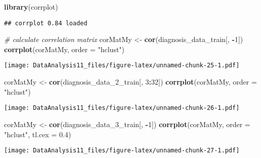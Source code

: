 \documentclass[]{article}
\newenvironment{Shaded}{\begin{snugshade}}{\end{snugshade}}
\newcommand{\KeywordTok}[1]{\textcolor[rgb]{0.13,0.29,0.53}{\textbf{#1}}}
\newcommand{\DataTypeTok}[1]{\textcolor[rgb]{0.13,0.29,0.53}{#1}}
\newcommand{\DecValTok}[1]{\textcolor[rgb]{0.00,0.00,0.81}{#1}}
\newcommand{\FloatTok}[1]{\textcolor[rgb]{0.00,0.00,0.81}{#1}}
\newcommand{\StringTok}[1]{\textcolor[rgb]{0.31,0.60,0.02}{#1}}
\newcommand{\CommentTok}[1]{\textcolor[rgb]{0.56,0.35,0.01}{\textit{#1}}}
\newcommand{\OperatorTok}[1]{\textcolor[rgb]{0.81,0.36,0.00}{\textbf{#1}}}
\newcommand{\NormalTok}[1]{#1}
\begin{document}
\begin{Shaded}
\begin{Highlighting}[]
\KeywordTok{library}\NormalTok{(corrplot)}
\end{Highlighting}
\end{Shaded}

\begin{verbatim}
## corrplot 0.84 loaded
\end{verbatim}

\begin{Shaded}
\begin{Highlighting}[]
\CommentTok{# calculate correlation matrix}
\NormalTok{corMatMy <-}\StringTok{ }\KeywordTok{cor}\NormalTok{(diagnosis_data_train[, }\OperatorTok{-}\DecValTok{1}\NormalTok{])}
\KeywordTok{corrplot}\NormalTok{(corMatMy, }\DataTypeTok{order =} \StringTok{"hclust"}\NormalTok{)}
\end{Highlighting}
\end{Shaded}

\texttt{[image: DataAnalysis11\_files/figure-latex/unnamed-chunk-25-1.pdf]}

\begin{Shaded}
\begin{Highlighting}[]
\NormalTok{corMatMy <-}\StringTok{ }\KeywordTok{cor}\NormalTok{(diagnosis_data_2_train[, }\DecValTok{3}\OperatorTok{:}\DecValTok{32}\NormalTok{])}
\KeywordTok{corrplot}\NormalTok{(corMatMy, }\DataTypeTok{order =} \StringTok{"hclust"}\NormalTok{)}
\end{Highlighting}
\end{Shaded}

\texttt{[image: DataAnalysis11\_files/figure-latex/unnamed-chunk-26-1.pdf]}

\begin{Shaded}
\begin{Highlighting}[]
\NormalTok{corMatMy <-}\StringTok{ }\KeywordTok{cor}\NormalTok{(diagnosis_data_3_train[, }\OperatorTok{-}\DecValTok{1}\NormalTok{])}
\KeywordTok{corrplot}\NormalTok{(corMatMy, }\DataTypeTok{order =} \StringTok{"hclust"}\NormalTok{, }\DataTypeTok{tl.cex =} \FloatTok{0.4}\NormalTok{)}
\end{Highlighting}
\end{Shaded}

\texttt{[image: DataAnalysis11\_files/figure-latex/unnamed-chunk-27-1.pdf]}
\end{document}
